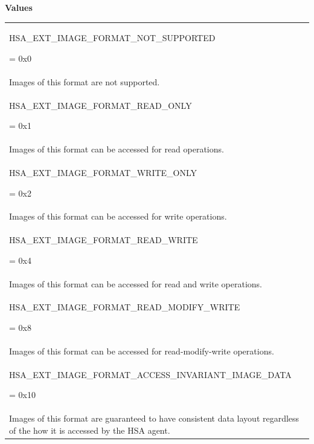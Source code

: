 \documentclass[final]{book}
\newcommand{\reftyp}[1]{#1}
\newcommand{\refenu}[1]{\reftyp{#1}}
\begin{document}
\noindent\textbf{Values}\\[-5mm]
\begin{longtable}{@{\hspace{2em}}p{\linewidth-2em}}
\hspace{-2em}\hypertarget{group__images_1ggaef83852ae5fb54b82317e96990da388aaae6fb99314cf823319737bd5b622a2f4}{\refenu{HSA_\-EXT_\-IMAGE_\-FORMAT_\-NOT_\-SUPPORTED}} = 0x0\\Images of this format are not supported.\\[2mm]
\hspace{-2em}\hypertarget{group__images_1ggaef83852ae5fb54b82317e96990da388aa3db3e90538f1fd5a45d7937f9c881b2a}{\refenu{HSA_\-EXT_\-IMAGE_\-FORMAT_\-READ_\-ONLY}} = 0x1\\Images of this format can be accessed for read operations.\\[2mm]
\hspace{-2em}\hypertarget{group__images_1ggaef83852ae5fb54b82317e96990da388aa489215daa4de11d09f2d3c1c8c212fcb}{\refenu{HSA_\-EXT_\-IMAGE_\-FORMAT_\-WRITE_\-ONLY}} = 0x2\\Images of this format can be accessed for write operations.\\[2mm]
\hspace{-2em}\hypertarget{group__images_1ggaef83852ae5fb54b82317e96990da388aaf88802f6e05d969561eccbb0a3f39222}{\refenu{HSA_\-EXT_\-IMAGE_\-FORMAT_\-READ_\-WRITE}} = 0x4\\Images of this format can be accessed for read and write operations.\\[2mm]
\hspace{-2em}\hypertarget{group__images_1ggaef83852ae5fb54b82317e96990da388aa852e4523bdab4f798240af94cc06aa65}{\refenu{HSA_\-EXT_\-IMAGE_\-FORMAT_\-READ_\-MODIFY_\-WRITE}} = 0x8\\Images of this format can be accessed for read-modify-write operations.\\[2mm]
\hspace{-2em}\hypertarget{group__images_1ggaef83852ae5fb54b82317e96990da388aa286344b2349f73e9f92400f589a05f60}{\refenu{HSA_\-EXT_\-IMAGE_\-FORMAT_\-ACCESS_\-INVARIANT_\-IMAGE_\-DATA}} = 0x10\\Images of this format are guaranteed to have consistent data layout regardless of the how it is accessed by the HSA agent.
\end{longtable}
\end{document}
